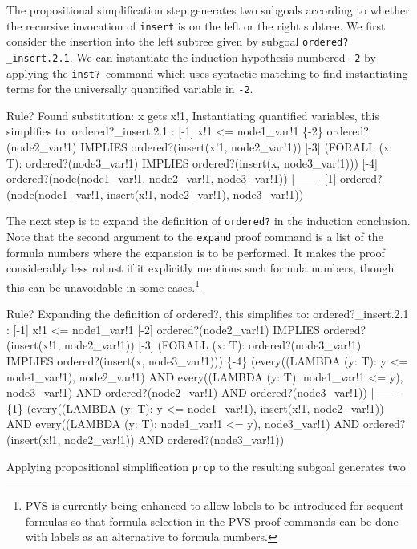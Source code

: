 \documentclass[11pt,twoside]{book}
\begin{document}
The propositional simplification step generates two subgoals according
to whether the recursive invocation of \texttt{insert} is on the left or
the right subtree.  We first consider the insertion into the left
subtree given by subgoal \texttt{ordered?\_insert.2.1}\@.
We can instantiate the induction hypothesis numbered \texttt{-2}
by applying the \texttt{inst?}\ command which uses syntactic
matching to find instantiating terms for the universally quantified
variable in \texttt{-2}.
\begin{session*}\label{ordered?_insert.2.1}
Rule? 
Found substitution:
x gets x!1,
Instantiating quantified variables,
this simplifies to: 
ordered?_insert.2.1 :  
[-1]   x!1 <= node1_var!1
\{-2\}   ordered?(node2_var!1) IMPLIES ordered?(insert(x!1, node2_var!1))
[-3]   (FORALL (x: T):
         ordered?(node3_var!1) IMPLIES ordered?(insert(x, node3_var!1)))
[-4]   ordered?(node(node1_var!1, node2_var!1, node3_var!1))
  |-------
[1]   ordered?(node(node1_var!1, insert(x!1, node2_var!1), node3_var!1))
\end{session*}
The next step is to expand the definition of \texttt{ordered?}
in the induction conclusion.  Note that the second argument to the \texttt{expand} proof command is a list of the formula numbers where the expansion
is to be performed.  It makes the proof considerably less robust if it
explicitly mentions such formula numbers, though this can be unavoidable
in some cases.\footnote{PVS is currently being enhanced to allow labels
to be introduced for sequent formulas so that formula selection in the PVS
proof commands can be done with labels as an alternative to formula
numbers.} 
\begin{session*}
Rule? 
Expanding the definition of ordered?,
this simplifies to: 
ordered?_insert.2.1 :  
[-1]   x!1 <= node1_var!1
[-2]   ordered?(node2_var!1) IMPLIES ordered?(insert(x!1, node2_var!1))
[-3]   (FORALL (x: T):
         ordered?(node3_var!1) IMPLIES ordered?(insert(x, node3_var!1)))
\{-4\}   (every((LAMBDA (y: T): y <= node1_var!1), node2_var!1)
           AND every((LAMBDA (y: T): node1_var!1 <= y), node3_var!1)
             AND ordered?(node2_var!1) AND ordered?(node3_var!1))
  |-------
\{1\}   (every((LAMBDA (y: T): y <= node1_var!1), insert(x!1, node2_var!1))
           AND every((LAMBDA (y: T): node1_var!1 <= y), node3_var!1)
             AND ordered?(insert(x!1, node2_var!1)) AND ordered?(node3_var!1))
\end{session*}
Applying propositional
simplification \texttt{prop} to the resulting subgoal generates two
\end{document}
